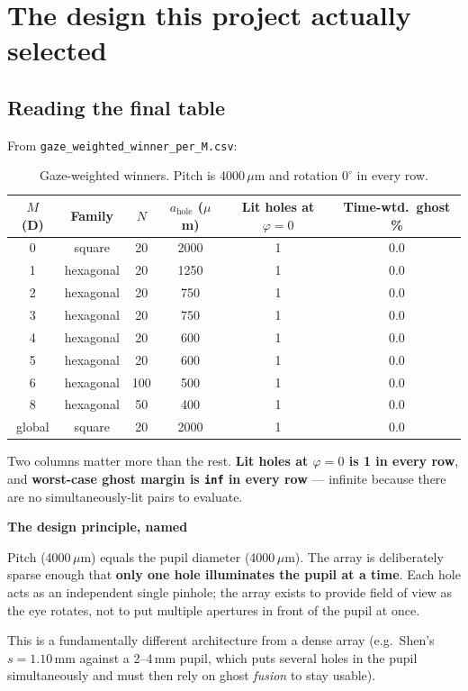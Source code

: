 \documentclass[11pt]{report}
\newenvironment{keybox}[1]%
{\par\vspace{8pt}\begin{lrbox}{\kbsave}\begin{minipage}{0.88\textwidth}%
{\bfseries\color{hbblue}#1}\par\vspace{4pt}\ignorespaces}%
{\end{minipage}\end{lrbox}%
\begin{center}\setlength{\fboxrule}{1.2pt}\setlength{\fboxsep}{8pt}%
\fcolorbox{hbblue}{boxgrey}{\usebox{\kbsave}}\end{center}\vspace{8pt}\par}
\newcommand{\ahole}{a_{\text{hole}}}
\begin{document}
\chapter{The design this project actually selected}

\section{Reading the final table}

From \texttt{gaze\_weighted\_winner\_per\_M.csv}:

\begin{longtable}{cccccc}
\caption{Gaze-weighted winners. Pitch is 4000\,$\mu$m and rotation $0^\circ$ in every row.}\\
\toprule
$M$ (D) & Family & $N$ & $\ahole$ ($\mu$m) & Lit holes at $\varphi{=}0$ & Time-wtd.\ ghost \% \\
\midrule
\endhead
0 & square & 20 & 2000 & 1 & 0.0 \\
1 & hexagonal & 20 & 1250 & 1 & 0.0 \\
2 & hexagonal & 20 & 750 & 1 & 0.0 \\
3 & hexagonal & 20 & 750 & 1 & 0.0 \\
4 & hexagonal & 20 & 600 & 1 & 0.0 \\
5 & hexagonal & 20 & 600 & 1 & 0.0 \\
6 & hexagonal & 100 & 500 & 1 & 0.0 \\
8 & hexagonal & 50 & 400 & 1 & 0.0 \\
global & square & 20 & 2000 & 1 & 0.0 \\
\bottomrule
\end{longtable}

Two columns matter more than the rest. \textbf{Lit holes at $\varphi=0$ is 1 in every row}, and
\textbf{worst-case ghost margin is \texttt{inf} in every row} --- infinite because there are no
simultaneously-lit pairs to evaluate.

\begin{keybox}{The design principle, named}
Pitch (4000\,$\mu$m) equals the pupil diameter (4000\,$\mu$m). The array is deliberately sparse
enough that \textbf{only one hole illuminates the pupil at a time}. Each hole acts as an
independent single pinhole; the array exists to provide field of view as the eye rotates, not to
put multiple apertures in front of the pupil at once.

This is a fundamentally different architecture from a dense array (e.g.\ Shen's $s = 1.10$\,mm
against a 2--4\,mm pupil, which puts several holes in the pupil simultaneously and must then rely
on ghost \emph{fusion} to stay usable).
\end{keybox}
\end{document}
